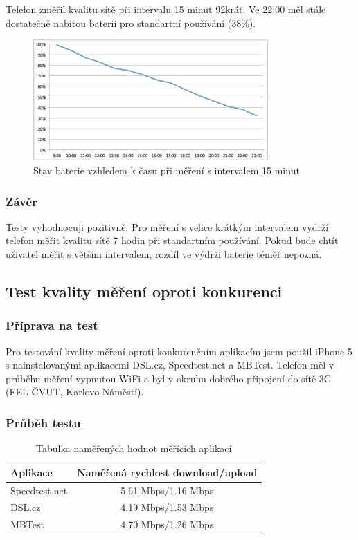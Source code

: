 Telefon změřil kvalitu sítě při intervalu 15 minut  92krát. Ve 22:00 měl stále dostatečně nabitou baterii pro standartní používání (38\%).

\newpage

\begin{figure}[h]
  	\centering
    \includegraphics[width=0.8\textwidth]{figures/04_testing/graph15.jpg}
    \caption{Stav baterie vzhledem k času při měření s intervalem 15 minut}
    \label{batt2}
\end{figure}

\subsubsection*{Závěr}
Testy vyhodnocuji pozitivně. Pro měření s velice krátkým intervalem vydrží telefon měřit kvalitu sítě 7 hodin při standartním používání. Pokud bude chtít uživatel měřit s větším intervalem, rozdíl ve výdrži baterie téměř nepozná.

\subsection{Test kvality měření oproti konkurenci}

\subsubsection{Příprava na test}
Pro testování kvality měření oproti konkurenčním aplikacím jsem použil iPhone 5 s nainstalovanými aplikacemi DSL.cz, Speedtest.net a MBTest. Telefon měl v průběhu měření vypnutou WiFi a byl v okruhu dobrého připojení do sítě 3G (FEL ČVUT, Karlovo Náměstí).

\subsubsection{Průběh testu}

\begin{table}[h]
	\begin{center}
		\begin{tabular}{|l|c|}
			\hline
				{\bf Aplikace} & {\bf Naměřená rychlost download/upload}\\
			\hline \hline
				Speedtest.net & 5.61 Mbps/1.16 Mbps\\
				\hline
				DSL.cz & 4.19 Mbps/1.53 Mbps\\
				\hline
				MBTest & 4.70 Mbps/1.26 Mbps\\
				\hline
		\end{tabular}
	\end{center}
	\caption{Tabulka naměřených hodnot měřících aplikací}
	\label{tab.speed}
\end{table}

